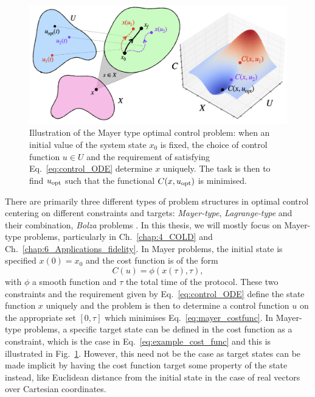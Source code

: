 \documentclass[a4paper,oneside,11pt]{book}
\begin{document}
\begin{figure}[t]
\centering
\includegraphics[width=0.9\linewidth]{images/optimal_control_illustration.png} \caption[Illustration of optimal control problem structure]{Illustration of the Mayer type optimal control problem: when an initial value of the system state $x_0$ is fixed, the choice of control function $u \in U$ and the requirement of satisfying Eq.~\eqref{eq:control_ODE} determine $x$ uniquely. The task is then to find $u_{\rm opt}$ such that the functional $C(x, u_{\rm opt})$ is minimised.}\label{fig:optimal_control}
\end{figure}

There are primarily three different types of problem structures in optimal control centering on different constraints and targets: \emph{Mayer-type}, \emph{Lagrange-type} and their combination, \emph{Bolza} problems \cite{dalessandro_introduction_2021}. In this thesis, we will mostly focus on Mayer-type problems, particularly in Ch.~\ref{chap:4_COLD} and Ch.~\ref{chap:6_Applications_fidelity}. In Mayer problems, the initial state is specified $x(0) = x_0$ and the cost function is of the form
\begin{equation}\label{eq:mayer_costfunc}
    C(u) = \phi(x(\tau), \tau),
\end{equation}
with $\phi$ a smooth function and $\tau$ the total time of the protocol. These two constraints and the requirement given by Eq.~\eqref{eq:control_ODE} define the state function $x$ uniquely and the problem is then to determine a control function $u$ on the appropriate set $[0, \tau]$ which minimises Eq.~\eqref{eq:mayer_costfunc}. In Mayer-type problems, a specific target state can be defined in the cost function as a constraint, which is the case in Eq.~\eqref{eq:example_cost_func} and this is illustrated in Fig.~\ref{fig:optimal_control}. However, this need not be the case as target states can be made implicit by having the cost function target some property of the state instead, like Euclidean distance from the initial state in the case of real vectors over Cartesian coordinates. 
\end{document}
